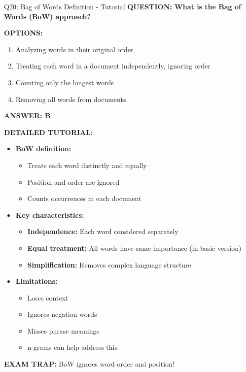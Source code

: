 \documentclass[8pt]{beamer}
\begin{document}
	\begin{frame}{Q20: Bag of Words Definition - Tutorial}
		\fontsize{6.5}{7.5}\selectfont
		\textbf{QUESTION: What is the Bag of Words (BoW) approach?}
		
		\vspace{0.1cm}
		\textbf{OPTIONS:}
		\begin{enumerate}
			\item Analyzing words in their original order
			\item Treating each word in a document independently, ignoring order
			\item Counting only the longest words
			\item Removing all words from documents
		\end{enumerate}
		
		\vspace{0.1cm}
		\textcolor{myblue}{\textbf{ANSWER: B}}
		
		\vspace{0.1cm}
		\textbf{DETAILED TUTORIAL:}
		\begin{itemize}
			\item \textbf{BoW definition:}
			\begin{itemize}
				\item Treats each word distinctly and equally
				\item Position and order are ignored
				\item Counts occurrences in each document
			\end{itemize}
			\item \textbf{Key characteristics:}
			\begin{itemize}
				\item \textbf{Independence:} Each word considered separately
				\item \textbf{Equal treatment:} All words have same importance (in basic version)
				\item \textbf{Simplification:} Removes complex language structure
			\end{itemize}
			\item \textbf{Limitations:}
			\begin{itemize}
				\item Loses context
				\item Ignores negation words
				\item Misses phrase meanings
				\item n-grams can help address this
			\end{itemize}
		\end{itemize}
		
		\textcolor{myred}{\textbf{EXAM TRAP:}} BoW ignores \textcolor{myblue}{word order and position}!
	\end{frame}
	
\end{document}
